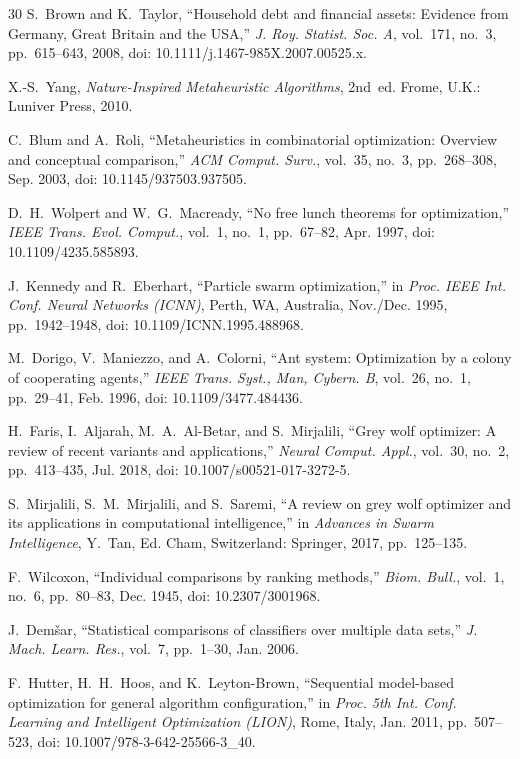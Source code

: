 \documentclass[journal]{IEEEtran}
\begin{document}
\begin{thebibliography}{30}
S.~Brown and K.~Taylor, ``Household debt and financial assets: Evidence from Germany, Great Britain and the USA,'' \emph{J. Roy. Statist. Soc. A}, vol.~171, no.~3, pp.~615--643, 2008, doi: 10.1111/j.1467-985X.2007.00525.x.

X.-S.~Yang, \emph{Nature-Inspired Metaheuristic Algorithms}, 2nd~ed. Frome, U.K.: Luniver Press, 2010.

C.~Blum and A.~Roli, ``Metaheuristics in combinatorial optimization: Overview and conceptual comparison,'' \emph{ACM Comput. Surv.}, vol.~35, no.~3, pp.~268--308, Sep. 2003, doi: 10.1145/937503.937505.

D.~H.~Wolpert and W.~G.~Macready, ``No free lunch theorems for optimization,'' \emph{IEEE Trans. Evol. Comput.}, vol.~1, no.~1, pp.~67--82, Apr. 1997, doi: 10.1109/4235.585893.

J.~Kennedy and R.~Eberhart, ``Particle swarm optimization,'' in \emph{Proc. IEEE Int. Conf. Neural Networks (ICNN)}, Perth, WA, Australia, Nov./Dec. 1995, pp.~1942--1948, doi: 10.1109/ICNN.1995.488968.

M.~Dorigo, V.~Maniezzo, and A.~Colorni, ``Ant system: Optimization by a colony of cooperating agents,'' \emph{IEEE Trans. Syst., Man, Cybern. B}, vol.~26, no.~1, pp.~29--41, Feb. 1996, doi: 10.1109/3477.484436.

H.~Faris, I.~Aljarah, M.~A.~Al-Betar, and S.~Mirjalili, ``Grey wolf optimizer: A review of recent variants and applications,'' \emph{Neural Comput. Appl.}, vol.~30, no.~2, pp.~413--435, Jul. 2018, doi: 10.1007/s00521-017-3272-5.

S.~Mirjalili, S.~M.~Mirjalili, and S.~Saremi, ``A review on grey wolf optimizer and its applications in computational intelligence,'' in \emph{Advances in Swarm Intelligence}, Y.~Tan, Ed. Cham, Switzerland: Springer, 2017, pp.~125--135.

F.~Wilcoxon, ``Individual comparisons by ranking methods,'' \emph{Biom. Bull.}, vol.~1, no.~6, pp.~80--83, Dec. 1945, doi: 10.2307/3001968.

J.~Demšar, ``Statistical comparisons of classifiers over multiple data sets,'' \emph{J. Mach. Learn. Res.}, vol.~7, pp.~1--30, Jan. 2006.

F.~Hutter, H.~H.~Hoos, and K.~Leyton-Brown, ``Sequential model-based optimization for general algorithm configuration,'' in \emph{Proc. 5th Int. Conf. Learning and Intelligent Optimization (LION)}, Rome, Italy, Jan. 2011, pp.~507--523, doi: 10.1007/978-3-642-25566-3\_40.


\end{thebibliography}
\end{document}
